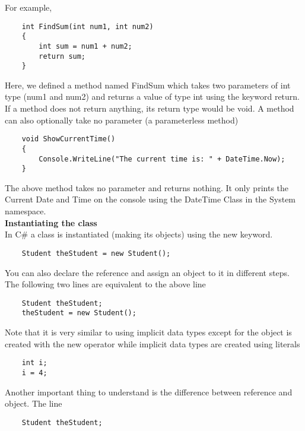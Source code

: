 For example,

\begin{lstlisting}
    int FindSum(int num1, int num2)
    {
        int sum = num1 + num2;
        return sum;
    }    
\end{lstlisting}

Here, we defined a method named FindSum which takes two parameters of int type (num1 and num2) and returns
a value of type int using the keyword return. If a method does not return anything, its return type would be void. A
method can also optionally take no parameter (a parameterless method)

\begin{lstlisting}
    void ShowCurrentTime()
    {
        Console.WriteLine("The current time is: " + DateTime.Now);
    }        
\end{lstlisting}

The above method takes no parameter and returns nothing. It only prints the Current Date and Time on the console
using the DateTime Class in the System namespace.\\

\textbf{Instantiating the class}\\

In C\# a class is instantiated (making its objects) using the new keyword.

\begin{lstlisting}
    Student theStudent = new Student();    
\end{lstlisting}

You can also declare the reference and assign an object to it in different steps. The following two lines are
equivalent to the above line

\begin{lstlisting}
    Student theStudent;
    theStudent = new Student();        
\end{lstlisting}

Note that it is very similar to using implicit data types except for the object is created with the new operator while
implicit data types are created using literals

\begin{lstlisting}
    int i;
    i = 4;        
\end{lstlisting}

Another important thing to understand is the difference between reference and object. The line

\begin{lstlisting}
    Student theStudent;    
\end{lstlisting}

